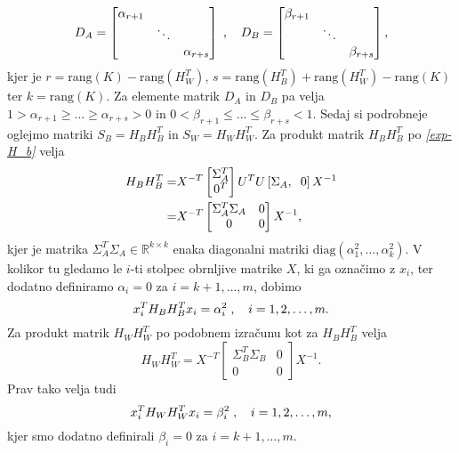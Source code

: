 \documentclass[mat1]{article}
\theoremstyle{definition}
\begin{document}
$$
D_A =
\begin{bmatrix}
\alpha_{r+1} & & \\
 & \ddots & \\
 & & \alpha_{r+s}
\end{bmatrix}
\hspace{1mm}
\text{,}
\hspace{4mm}
D_B = 
\begin{bmatrix}
\beta_{r+1} & & \\
 & \ddots & \\
 & & \beta_{r+s}
\end{bmatrix}
\text{,}
$$ kjer je
$r = \text{rang}(K) - \text{rang}(H_W^T)$,  $s = \text{rang}(H_B^T) + \text{rang}(H_W^T) - \text{rang}(K)$ ter $k = \text{rang}(K)$. Za elemente matrik $D_A$ in $D_B$ pa velja
$1 > \alpha_{r+1} \geq \ldots \geq \alpha_{r+s} > 0$ in $ 0 < \beta_{r+1} \leq \ldots \leq \beta_{r+s} < 1$.
Sedaj si podrobneje oglejmo matriki $S_B = H_B H_B^T$ in $S_W = H_W H_W^T$.
Za produkt matrik $H_B H_B^T$ po \textit{\eqref{exp-H_b}} velja
\begin{equation} %
\begin{split}
\nonumber
H_B H_B^T =&
X^{-T}
\begin{bmatrix}
\Sigma_A^T \\
0^T
\end{bmatrix}
U^T
U \left[\Sigma_A, \hspace{2mm} 0 \right] X^{-1}
\\
=& 
X^{-T}
\begin{bmatrix}
\Sigma_A^T \Sigma_A & 0 \\
0 & 0
\end{bmatrix}
X^{-1} \text{,}
\end{split}
\end{equation}
kjer je matrika $\Sigma_A^T \Sigma_A \in \mathbb{R}^{k \times k}$ enaka diagonalni matriki $\text{diag}\left(\alpha_1^2, \ldots, \alpha_k^2 \right)$. V kolikor tu gledamo le $i$-ti stolpec obrnljive matrike $X$, ki ga označimo z $x_i$, ter dodatno definiramo $\alpha_i = 0$ za $i = k+1, \ldots, m$, dobimo
\begin{equation} \label{H_B}
x_i^T H_B H_B^T x_i = \alpha_i^2
\hspace{1mm}
\text{,}
\hspace{4mm}
i = 1, 2, \ldots, m
\text{.}
\end{equation}
Za produkt matrik $H_W H_W^T$ po podobnem izračunu kot za $H_B H_B^T$ velja
\begin{equation} %
H_W H_W^T =
X^{-T}
\begin{bmatrix}
\Sigma_B^T \Sigma_B & 0 \\
0 & 0
\end{bmatrix}
X^{-1} \text{.}
\nonumber
\end{equation}
Prav tako velja tudi 
\begin{equation} \label{H_W}
x_i^T H_W H_W^T x_i = \beta_i^2
\hspace{1mm}
\text{,}
\hspace{4mm}
i = 1, 2, \ldots, m
\text{,}
\end{equation}
kjer smo dodatno definirali $\beta_i = 0$ za $i = k+1, \ldots, m$.
\end{document}
